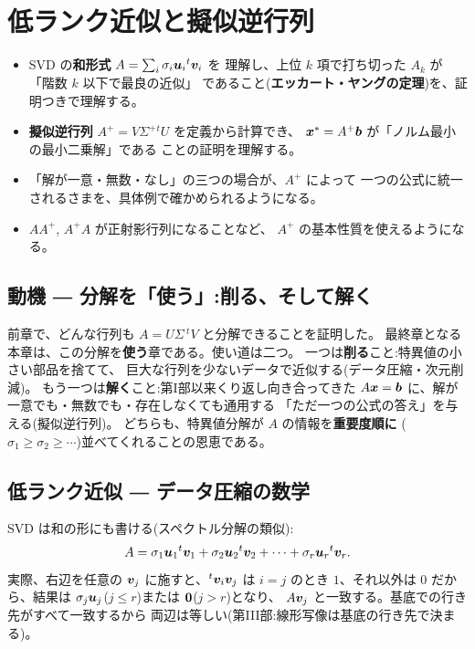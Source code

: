 \chapter{低ランク近似と擬似逆行列}\label{chap:pinv}

\begin{goal}
\begin{itemize}
\item SVD の\textbf{和形式} $A = \sum_i \sigma_i\bm{u}_i{}^t\bm{v}_i$ を
理解し、上位 $k$ 項で打ち切った $A_k$ が「階数 $k$ 以下で最良の近似」
であること(\textbf{エッカート・ヤングの定理})を、証明つきで理解する。
\item \textbf{擬似逆行列} $A^{+} = V\Sigma^{+}{}^tU$ を定義から計算でき、
$\bm{x}^* = A^{+}\bm{b}$ が「ノルム最小の最小二乗解」である
ことの証明を理解する。
\item 「解が一意・無数・なし」の三つの場合が、$A^{+}$ によって
一つの公式に統一されるさまを、具体例で確かめられるようになる。
\item $AA^{+}$, $A^{+}A$ が正射影行列になることなど、
$A^{+}$ の基本性質を使えるようになる。
\end{itemize}
\end{goal}

\section{動機 ― 分解を「使う」:削る、そして解く}

前章で、どんな行列も $A = U\Sigma\,{}^tV$ と分解できることを証明した。
最終章となる本章は、この分解を\textbf{使う}章である。使い道は二つ。
一つは\textbf{削る}こと:特異値の小さい部品を捨てて、
巨大な行列を少ないデータで近似する(データ圧縮・次元削減)。
もう一つは\textbf{解く}こと:第I部以来くり返し向き合ってきた
$A\bm{x} = \bm{b}$ に、解が一意でも・無数でも・存在しなくても通用する
「ただ一つの公式の答え」を与える(擬似逆行列)。
どちらも、特異値分解が $A$ の情報を\textbf{重要度順に}
($\sigma_1 \ge \sigma_2 \ge \cdots$)並べてくれることの恩恵である。

\section{低ランク近似 ― データ圧縮の数学}

SVD は和の形にも書ける(スペクトル分解の類似):
\[
A = \sigma_1 \bm{u}_1{}^t\bm{v}_1 + \sigma_2 \bm{u}_2{}^t\bm{v}_2
+ \cdots + \sigma_r \bm{u}_r{}^t\bm{v}_r.
\]
実際、右辺を任意の $\bm{v}_j$ に施すと、${}^t\bm{v}_i\bm{v}_j$ は
$i = j$ のとき $1$、それ以外は $0$ だから、結果は
$\sigma_j\bm{u}_j$($j \le r$)または $\bm{0}$($j > r$)となり、
$A\bm{v}_j$ と一致する。基底での行き先がすべて一致するから
両辺は等しい(第III部:線形写像は基底の行き先で決まる)。


